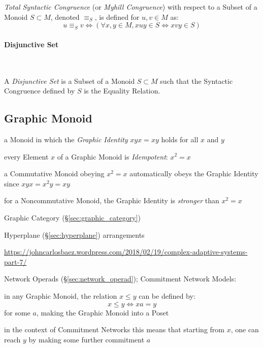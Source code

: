 \emph{Total Syntactic Congruence} (or \emph{Myhill Congruence}) with
respect to a Subset of a Monoid $S \subset M$, denoted $\equiv_S$, is
defined for $u,v \in M$ as:
\[
  u \equiv_S v \Leftrightarrow
  (\forall x,y \in M, xuy \in S \Leftrightarrow xvy \in S)
\]



\paragraph{Disjunctive Set}\label{sec:disjunctive_set}\hfill \\\hfill

A \emph{Disjunctive Set} is a Subset of a Monoid $S \subset M$ such
that the Syntactic Congruence defined by $S$ is the Equality Relation.



\subsection{Graphic Monoid}\label{sec:graphic_monoid}

a Monoid in which the \emph{Graphic Identity} $xyx = xy$ holds for all $x$ and
$y$

every Element $x$ of a Graphic Monoid is \emph{Idempotent}: $x^2 = x$

a Commutative Monoid obeying $x^2 = x$ automatically obeys the Graphic Identity
since $xyx = x^2y = xy$

for a Noncommutative Monoid, the Graphic Identity is \emph{stronger} than $x^2
= x$


Graphic Category (\S\ref{sec:graphic_category})

Hyperplane (\S\ref{sec:hyperplane}) arrangements

\url{https://johncarlosbaez.wordpress.com/2018/02/19/complex-adaptive-systems-part-7/}

Network Operads (\S\ref{sec:network_operad}); Commitment Network Models:

in any Graphic Monoid, the relation $x \leq y$ can be defined by:
\[
  x \leq y \Leftrightarrow x a = y
\]
for some $a$, making the Graphic Monoid into a Poset

in the context of Commitment Networks this means that starting from $x$, one
can reach $y$ by making some further commitment $a$



